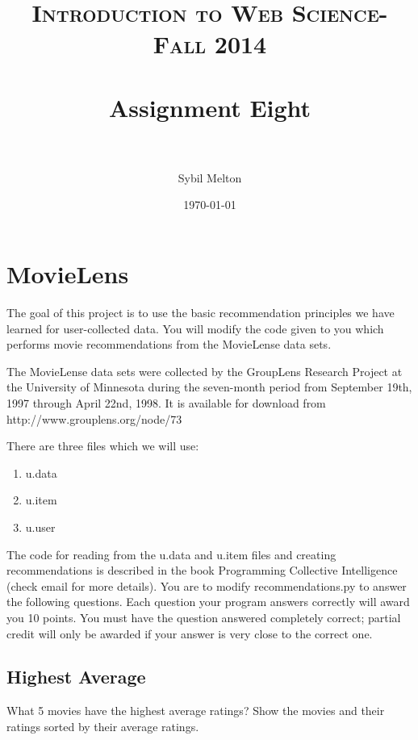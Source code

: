 \documentclass[paper=a4, fontsize=11pt]{scrartcl} %
\title{	
\normalfont \normalsize 
\textsc{Introduction to Web Science- Fall 2014} \\ [25pt] %
\horrule{0.5pt} \\[0.4cm] %
\huge Assignment Eight \\ %
\horrule{2pt} \\[0.5cm] %
}
\author{Sybil Melton} %
\date{\normalsize\today} %
\numberwithin{equation}{section} %
\numberwithin{figure}{section} %
\numberwithin{table}{section} %
\begin{document}
\maketitle %
\newpage
\tableofcontents
\lstlistoflistings
\newpage

\section{MovieLens}
The goal of this project is to use the basic recommendation principles
we have learned for user-collected data. You will modify the code
given to you which performs movie recommendations from the MovieLense
data sets.

The MovieLense data sets were collected by the GroupLens Research
Project at the University of Minnesota during the seven-month period
from September 19th, 1997 through April 22nd, 1998. It is available
for download from http://www.grouplens.org/node/73

There are three files which we will use:
\begin{enumerate}
\item u.data
\item u.item
\item u.user
\end{enumerate}

The code for reading from the u.data and u.item files and creating
recommendations is described in the book Programming Collective
Intelligence (check email for more details). You are to modify
recommendations.py to answer the following questions. Each question
your program answers correctly will award you 10 points. You must
have the question answered completely correct; partial credit will
only be awarded if your answer is very close to the correct one.


\subsection{Highest Average}
What 5 movies have the highest average ratings?
Show the movies and their ratings sorted by their average ratings.
\end{document}
